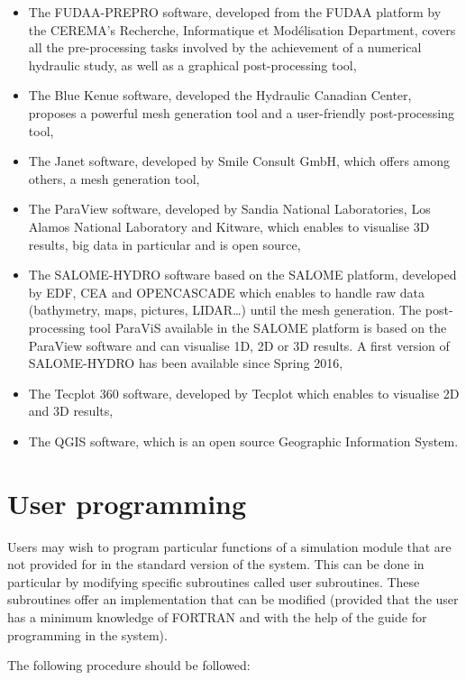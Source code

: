 \begin{itemize}
\item The FUDAA-PREPRO software, developed from the FUDAA platform
by the CEREMA's Recherche, Informatique et Modélisation Department, covers all
the pre-processing tasks involved by the achievement of a numerical hydraulic
study, as well as a graphical post-processing tool,
\item The Blue Kenue software, developed the Hydraulic Canadian
Center, proposes a powerful mesh generation tool and a user-friendly
post-processing tool,
\item The Janet software, developed by Smile Consult GmbH, which offers among
others, a mesh generation tool,
\item The ParaView software, developed by Sandia National Laboratories, Los
Alamos National Laboratory and Kitware, which enables to visualise 3D results,
big data in particular and is open source,
\item The SALOME-HYDRO software based on the SALOME platform, developed by EDF,
CEA and OPENCASCADE which enables to handle raw data (bathymetry, maps,
pictures, LIDAR\ldots) until the mesh generation.
The post-processing tool ParaViS available in the SALOME platform is based on
the ParaView software and can visualise 1D, 2D or 3D results.
A first version of SALOME-HYDRO has been available since Spring 2016,
\item The Tecplot 360 software, developed by Tecplot which enables to visualise
2D and 3D results,
\item The QGIS software, which is an open source Geographic Information System.
\end{itemize}


\section{User programming}

Users may wish to program particular functions of a simulation module
that are not provided for in the standard version of the \tel system.
This can be done in particular by modifying specific subroutines called user
subroutines.
These subroutines offer an implementation that can be modified
(provided that the user has a minimum knowledge of FORTRAN and with the help
of the guide for programming in the \tel system).

The following procedure should be followed:

